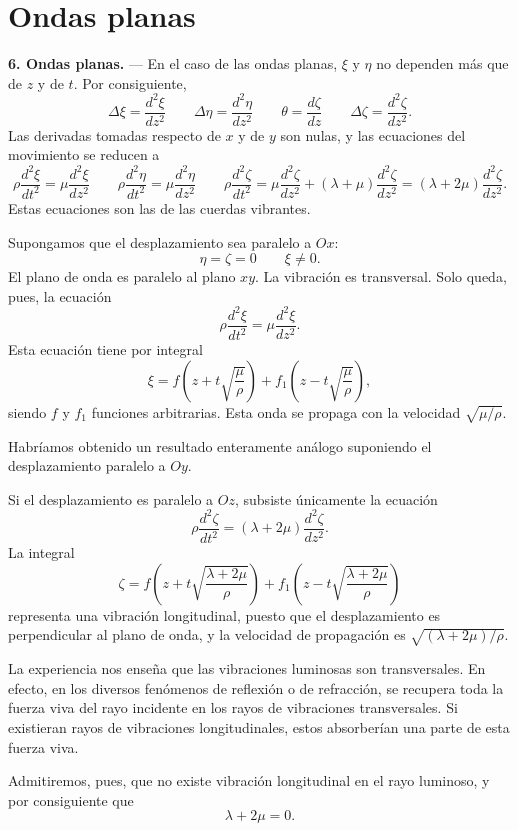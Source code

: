 \section{Ondas planas}
\label{sec:vol2-cap1-ondas-planas-1}

\noindent\textbf{6. Ondas planas.} — En el caso de las ondas planas,
$\xi$ y $\eta$ no dependen más que de $z$ y de $t$. Por consiguiente,
\[
\Delta\xi=\frac{d^2\xi}{dz^2}\qquad \Delta\eta=\frac{d^2\eta}{dz^2}\qquad
\theta=\frac{d\zeta}{dz}\qquad \Delta\zeta=\frac{d^2\zeta}{dz^2}.
\]
Las derivadas tomadas respecto de $x$ y de $y$ son nulas, y las ecuaciones
del movimiento se reducen a
\[
\rho\frac{d^2\xi}{dt^2}=\mu\frac{d^2\xi}{dz^2}\qquad
\rho\frac{d^2\eta}{dt^2}=\mu\frac{d^2\eta}{dz^2}\qquad
\rho\frac{d^2\zeta}{dt^2}=\mu\frac{d^2\zeta}{dz^2}+(\lambda+\mu)\frac{d^2\zeta}{dz^2}
=(\lambda+2\mu)\frac{d^2\zeta}{dz^2}.
\]
Estas ecuaciones son las de las cuerdas vibrantes.

Supongamos que el desplazamiento sea paralelo a $Ox$:
\[
\eta=\zeta=0 \qquad \xi\neq 0.
\]
El plano de onda es paralelo al plano $xy$. La vibración es transversal.
Solo queda, pues, la ecuación
\[
\rho\frac{d^2\xi}{dt^2}=\mu\frac{d^2\xi}{dz^2}.
\]
Esta ecuación tiene por integral
\[
\xi=f\left(z+t\sqrt{\frac{\mu}{\rho}}\right)+f_1\left(z-t\sqrt{\frac{\mu}{\rho}}\right),
\]
siendo $f$ y $f_1$ funciones arbitrarias. Esta onda se propaga con la
velocidad $\sqrt{\mu/\rho}$.

Habríamos obtenido un resultado enteramente análogo suponiendo el
desplazamiento paralelo a $Oy$.

Si el desplazamiento es paralelo a $Oz$, subsiste únicamente la ecuación
\[
\rho\frac{d^2\zeta}{dt^2}=(\lambda+2\mu)\frac{d^2\zeta}{dz^2}.
\]
La integral
\[
\zeta=f\left(z+t\sqrt{\frac{\lambda+2\mu}{\rho}}\right)+f_1\left(z-t\sqrt{\frac{\lambda+2\mu}{\rho}}\right)
\]
representa una vibración longitudinal, puesto que el desplazamiento es
perpendicular al plano de onda, y la velocidad de propagación es
$\sqrt{(\lambda+2\mu)/\rho}$.

La experiencia nos enseña que las vibraciones luminosas son transversales.
En efecto, en los diversos fenómenos de reflexión o de refracción, se
recupera toda la fuerza viva del rayo incidente en los rayos de vibraciones
transversales. Si existieran rayos de vibraciones longitudinales, estos
absorberían una parte de esta fuerza viva.

Admitiremos, pues, que no existe vibración longitudinal en el rayo
luminoso, y por consiguiente que
\[
\lambda+2\mu=0.
\]

